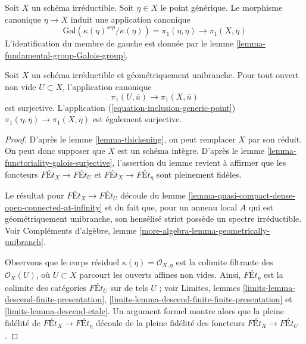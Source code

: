 \noindent
Soit $X$ un schéma irréductible. Soit $\eta \in X$ le point générique.
Le morphisme canonique $\eta \to X$ induit une application canonique
\begin{equation}
\label{equation-inclusion-generic-point}
\text{Gal}(\kappa(\eta)^{sep}/\kappa(\eta)) = \pi_1(\eta, \overline{\eta})
\longrightarrow \pi_1(X, \overline{\eta})
\end{equation}
L'identification du membre de gauche est donnée par le
lemme \ref{lemma-fundamental-group-Galois-group}.

\begin{lemma}
\label{lemma-irreducible-geometrically-unibranch}
Soit $X$ un schéma irréductible et géométriquement unibranche.
Pour tout ouvert non vide $U \subset X$, l'application canonique
$$
\pi_1(U, \overline{u}) \longrightarrow \pi_1(X, \overline{u})
$$
est surjective. L'application (\ref{equation-inclusion-generic-point})
$\pi_1(\eta, \overline{\eta}) \to \pi_1(X, \overline{\eta})$
est également surjective.
\end{lemma}

\begin{proof}
D'après le lemme \ref{lemma-thickening}, on peut remplacer $X$ par son réduit.
On peut donc supposer que $X$ est un schéma intègre. D'après le
lemme \ref{lemma-functoriality-galois-surjective},
l'assertion du lemme revient à affirmer que
les foncteurs $\textit{F\'Et}_X \to \textit{F\'Et}_U$ et
$\textit{F\'Et}_X \to \textit{F\'Et}_\eta$ sont pleinement fidèles.

\medskip\noindent
Le résultat pour $\textit{F\'Et}_X \to \textit{F\'Et}_U$ découle
du lemme \ref{lemma-quasi-compact-dense-open-connected-at-infinity}
et du fait que, pour un anneau local $A$ qui est
géométriquement unibranche, son hensélisé strict possède un
spectre irréductible. Voir
Compléments d'algèbre, lemme \ref{more-algebra-lemma-geometrically-unibranch}.

\medskip\noindent
Observons que le corps résiduel $\kappa(\eta) = \mathcal{O}_{X, \eta}$
est la colimite filtrante des $\mathcal{O}_X(U)$, où $U \subset X$
parcourt les ouverts affines non vides. Ainsi, $\textit{F\'Et}_\eta$ est la colimite des
catégories $\textit{F\'Et}_U$ sur de tels $U$ ; voir
Limites, lemmes \ref{limits-lemma-descend-finite-presentation},
\ref{limits-lemma-descend-finite-finite-presentation} et
\ref{limits-lemma-descend-etale}.
Un argument formel montre alors que la pleine fidélité de
$\textit{F\'Et}_X \to \textit{F\'Et}_\eta$ découle de la
pleine fidélité des foncteurs $\textit{F\'Et}_X \to \textit{F\'Et}_U$.
\end{proof}

